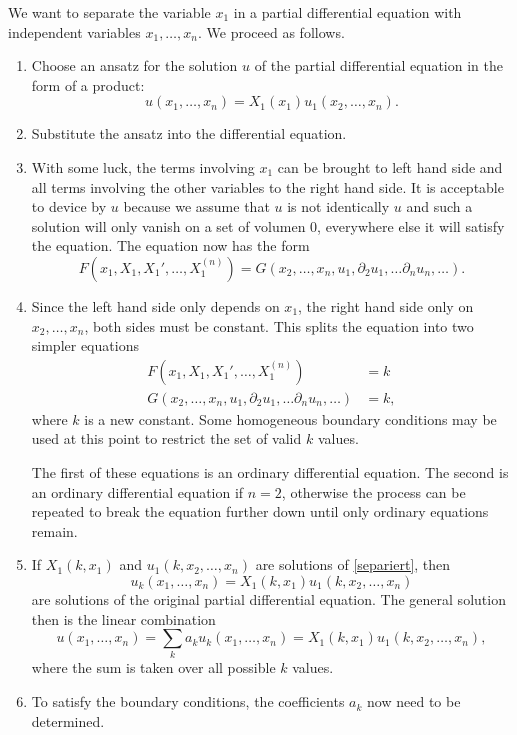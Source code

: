 We want to separate the variable $x_1$ in a partial differential
equation with independent variables $x_1,\dots,x_n$.
We proceed as follows.
\begin{enumerate}
\item
Choose an ansatz for the solution $u$ of the partial differential equation
in the form of a product:
\[
u(x_1,\dots,x_n)=X_1(x_1)u_1(x_2,\dots,x_n).
\]
\item
Substitute the ansatz into the differential equation.
\item
With some luck, the terms involving $x_1$ can be brought to
left hand side and all terms involving the other variables to
the right hand side.
It is acceptable to device by $u$ because we assume that $u$ is not
identically $u$ and such a solution will only vanish on a set of
volumen $0$, everywhere else it will satisfy the equation.
The equation now has the form
\[
F(x_1,X_1,X_1',\dots,X_1^{(n)})
=
G(x_2,\dots,x_n,u_1,\partial_2u_1,\dots\partial_nu_n,\dots).
\]
\item
Since the left hand side only depends on $x_1$, the right hand side
only on $x_2,\dots,x_n$, both sides must be constant.
This splits the equation into two simpler equations
\begin{equation}
\begin{aligned}
F(x_1, X_1,X_1',\dots, X_1^{(n)})&=k\\
G(x_2,\dots,x_n,u_1,\partial_2u_1,\dots\partial_nu_n,\dots)&=k,
\end{aligned}
\label{separiert}
\end{equation}
where $k$ is a new constant.
Some homogeneous boundary conditions may be used at this point to
restrict the set of valid $k$ values.

The first of these equations is an ordinary differential equation.
The second is an ordinary differential equation if $n=2$, otherwise
the process can be repeated to break the equation further down until
only ordinary equations remain.

\item
If
$X_1(k,x_1)$ and $u_1(k,x_2,\dots,x_n)$ are solutions of \eqref{separiert},
then
\[
u_k(x_1,\dots,x_n)=X_1(k,x_1)u_1(k,x_2,\dots,x_n)
\]
are solutions of the original partial differential equation.
The general solution then is the linear combination
\[
u(x_1,\dots,x_n)=
\sum_{k}
a_k
u_k(x_1,\dots,x_n)=X_1(k,x_1)u_1(k,x_2,\dots,x_n),
\]
where the sum is taken over all possible $k$ values.
\item
To satisfy the boundary conditions, the coefficients $a_k$ now need to
be determined.
\end{enumerate}
